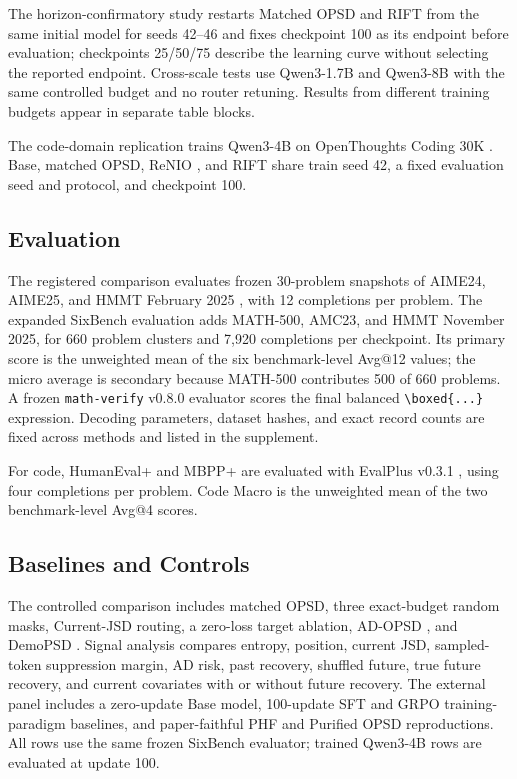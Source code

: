 \documentclass[letterpaper]{article}
\newcommand{\RIFT}{\textsc{RIFT}}
\begin{document}
The horizon-confirmatory study restarts Matched OPSD and \RIFT{} from the same
initial model for seeds 42--46 and fixes checkpoint 100 as its endpoint before
evaluation; checkpoints 25/50/75 describe the learning curve without selecting
the reported endpoint. Cross-scale tests use Qwen3-1.7B and Qwen3-8B with the
same controlled budget and no router retuning. Results from different training
budgets appear in separate table blocks.

The code-domain replication trains Qwen3-4B on OpenThoughts Coding 30K
\citep{guha2025openthoughts}. Base, matched OPSD, ReNIO
\citep{lin2026renio}, and \RIFT{} share train seed 42, a fixed evaluation
seed and protocol, and checkpoint 100.

\subsection{Evaluation}

The registered comparison evaluates frozen 30-problem snapshots of AIME24,
AIME25, and HMMT February 2025
\citep{huggingfaceh4aime2024,yentinglinaime2025,matharenahmmt2025}, with 12
completions per problem. The expanded SixBench evaluation adds MATH-500,
AMC23, and HMMT November 2025, for 660 problem clusters and 7,920 completions
per checkpoint. Its primary score is the unweighted mean of the six
benchmark-level Avg@12 values; the micro average is secondary because
MATH-500 contributes 500 of 660 problems. A frozen \texttt{math-verify}
v0.8.0 evaluator \citep{kydlicek2024mathverify} scores the final balanced
\verb|\boxed{...}| expression. Decoding parameters, dataset hashes, and exact
record counts are fixed across methods and listed in the supplement.

For code, HumanEval+ and MBPP+ are evaluated with EvalPlus v0.3.1
\citep{liu2023evalplus}, using four completions per problem. Code Macro is the
unweighted mean of the two benchmark-level Avg@4 scores.

\subsection{Baselines and Controls}

The controlled comparison includes matched OPSD, three exact-budget random
masks, Current-JSD routing, a zero-loss target ablation, AD-OPSD
\citep{peng2026adopsd}, and DemoPSD \citep{li2026demopsd}. Signal analysis
compares entropy, position, current JSD, sampled-token suppression margin, AD
risk, past recovery, shuffled future, true future recovery, and current
covariates with or without future recovery. The external panel includes
a zero-update Base model, 100-update SFT and GRPO training-paradigm baselines,
and paper-faithful PHF and Purified OPSD reproductions. All rows use the same
frozen SixBench evaluator; trained Qwen3-4B rows are evaluated at update 100.
\end{document}
